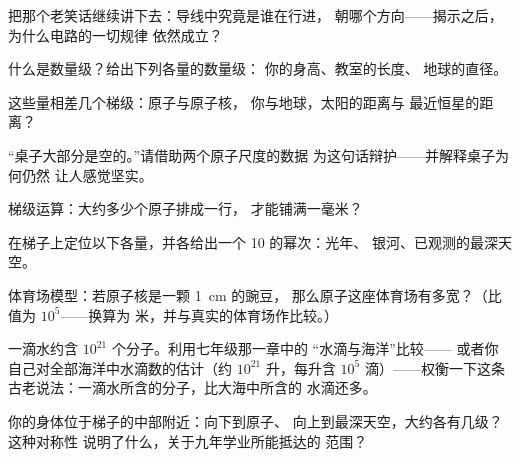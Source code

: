\begin{exercise}[$\star$]\label{exo:g9:atoms-to-galaxies:3}
把那个老笑话继续讲下去：导线中究竟是谁在行进，
朝哪个方向——揭示之后，为什么电路的一切规律
依然成立？
\end{exercise}

\begin{exercise}[$\star$]\label{exo:g9:atoms-to-galaxies:4}
什么是数量级？给出下列各量的数量级：
你的身高、教室的长度、
地球的直径。
\end{exercise}

\begin{exercise}[$\star$]\label{exo:g9:atoms-to-galaxies:5}
这些量相差几个梯级：原子与原子核，
你与地球，太阳的距离与
最近恒星的距离？
\end{exercise}

\begin{exercise}[$\star$]\label{exo:g9:atoms-to-galaxies:6}
“桌子大部分是空的。”请借助两个原子尺度的数据
为这句话辩护——并解释桌子为何仍然
让人感觉坚实。
\end{exercise}

\begin{exercise}[$\star$]\label{exo:g9:atoms-to-galaxies:7}
梯级运算：大约多少个原子排成一行，
才能铺满一毫米？
\end{exercise}

\begin{exercise}[$\star$]\label{exo:g9:atoms-to-galaxies:8}
在梯子上定位以下各量，并各给出一个 10 的幂次：光年、
银河、已观测的最深天空。
\end{exercise}

\begin{exercise}[$\star\star$]\label{exo:g9:atoms-to-galaxies:9}
体育场模型：若原子核是一颗 \qty{1}{cm} 的豌豆，
那么原子这座体育场有多宽？（比值为 $10^{5}$——换算为
米，并与真实的体育场作比较。）
\end{exercise}

\begin{exercise}[$\star\star$]\label{exo:g9:atoms-to-galaxies:10}
一滴水约含 $10^{21}$ 个分子。利用七年级那一章中的
“水滴与海洋”比较——
或者你自己对全部海洋中水滴数的估计（约
$10^{21}$ 升，每升含 $10^{5}$ 滴）——权衡一下这条
古老说法：一滴水所含的分子，比大海中所含的
水滴还多。
\end{exercise}

\begin{exercise}[$\star\star$]\label{exo:g9:atoms-to-galaxies:11}
你的身体位于梯子的中部附近：向下到原子、
向上到最深天空，大约各有几级？这种对称性
说明了什么，关于九年学业所能抵达的
范围？
\end{exercise}


